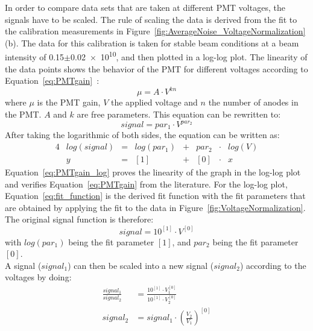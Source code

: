 In order to compare data sets that are taken at different PMT voltages, the signals have to be scaled. 
The rule of scaling the data is derived from the fit to the calibration measurements in Figure~\ref{fig:AverageNoise_VoltageNormalization} (b). 
The data for this calibration is taken for stable beam conditions at a beam intensity of \num{0.15}$\pm$\num{0.02e10}, and then plotted in a log-log plot. 
The linearity of the data points shows the behavior of the PMT for different voltages according to Equation~\ref{eq:PMTgain}~\cite{Hamamatsu}:
\begin{equation}
 \mu = A \cdot V^{kn} 
 \label{eq:PMTgain}
\end{equation}
where $\mu$ is the PMT gain, $V$ the applied voltage and $n$ the number of anodes in the PMT. 
$A$ and $k$ are free parameters. 
This equation can be rewritten to:
\begin{equation}
 signal = par_1 \cdot V^{par_2}
 \label{eq:PMTgain_simple}
\end{equation}
After taking the logarithmic of both sides, the equation can be written as:
\begin{alignat}{4}
 & log(signal) & = & log(par_1) & + & par_2 & \cdot &log(V) \label{eq:PMTgain_log} \\
 & y & = & [1] & + & [0] & \cdot & x \label{eq:fit_function}
\end{alignat}
Equation~\ref{eq:PMTgain_log} proves the linearity of the graph in the log-log plot and verifies Equation~\ref{eq:PMTgain} from the literature. 
For the log-log plot, Equation~\ref{eq:fit_function} is the derived fit function with the fit parameters that are obtained by applying the fit to the data in Figure~\ref{fig:VoltageNormalization}. 
The original signal function is therefore:
\begin{equation}
 signal = 10^{[1]} \cdot V^{[0]}
 \label{eq:PMTgain_simple_fitparameters}
\end{equation}
with $log(par_1)$ being the fit parameter $[1]$, and $par_2$ being the fit parameter $[0]$.\\
A signal ($signal_1$) can then be scaled into a new signal ($signal_2$) according to the voltages by doing:
\begin{align}
 \frac{signal_1}{signal_2} & = \frac{10^{[1]}\cdot V_1^{[0]}}{10^{[1]}\cdot V_2^{[0]}} \\
 signal_2 & = signal_1 \cdot \left( \frac{V_2}{V_1} \right) ^{[0]}
\end{align}


